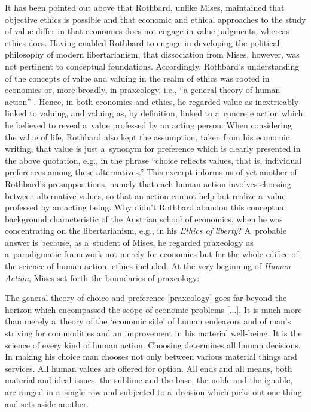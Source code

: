 It has been pointed out above that Rothbard, unlike Mises, maintained that objective ethics is possible and that economic and ethical approaches to the study of value differ in that economics does not engage in value judgments, whereas ethics does. Having enabled Rothbard to engage in developing the political philosophy of modern libertarianism, that dissociation from Mises, however, was not pertinent to conceptual foundations. Accordingly, Rothbard's understanding of the concepts of value and valuing in the realm of ethics was rooted in economics or, more broadly, in praxeology, i.e., ``a general theory of human action'' 
\parencite[][p.7]{}. %
 Hence, in both economics and ethics, he regarded value as inextricably linked to valuing, and valuing as, by definition, linked to a~concrete action which he believed to reveal a~value professed by an acting person. When considering the value of life, Rothbard also kept the assumption, taken from his economic writing, that value is just a~synonym for preference which is clearly presented in the above quotation, e.g., in the phrase ``choice reflects values, that is, individual preferences among these alternatives.'' This excerpt informs us of yet another of Rothbard's presuppositions, namely that each human action involves choosing between alternative values, so that an action cannot help but realize a~value professed by an acting being. Why didn't Rothbard abandon this conceptual background characteristic of the Austrian school of economics, when he was concentrating on the libertarianism, e.g., in his \textit{Ethics of liberty}? A~probable answer is because, as a~student of Mises, he regarded praxeology as a~paradigmatic framework not merely for economics but for the whole edifice of the science of human action, ethics included. At the very beginning of \textit{Human Action}, Mises 
\parencite*[][p.3]{} %
 set forth the boundaries of praxeology:



The general theory of choice and preference [praxeology] goes far beyond the horizon which encompassed the scope of economic problems [...]. It is much more than merely a~theory of the ‘economic side' of human endeavors and of man's striving for commodities and an improvement in his material well-being. It is the science of every kind of human action. Choosing determines all human decisions. In making his choice man chooses not only between various material things and services. All human values are offered for option. All ends and all means, both material and ideal issues, the sublime and the base, the noble and the ignoble, are ranged in a~single row and subjected to a~decision which picks out one thing and sets aside another.



